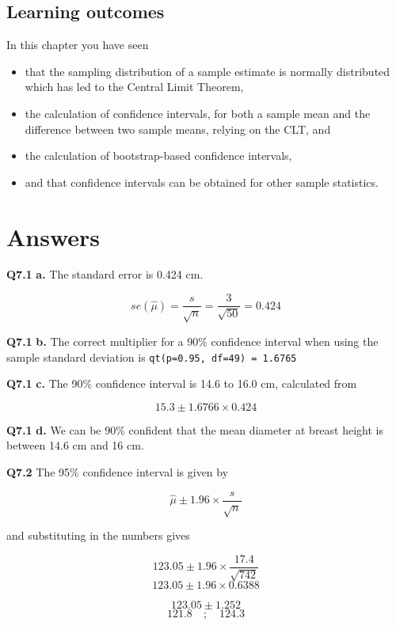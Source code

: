 \documentclass[
  oneside]{krantz}
\providecommand{\tightlist}{%
  \setlength{\itemsep}{0pt}\setlength{\parskip}{0pt}}
\begin{document}
\hypertarget{learning-outcomes-4}{%
\subsection{Learning outcomes}\label{learning-outcomes-4}}

In this chapter you have seen

\begin{itemize}
\tightlist
\item
  that the sampling distribution of a sample estimate is normally distributed which has led to the Central Limit Theorem,
\item
  the calculation of confidence intervals, for both a sample mean and the difference between two sample means, relying on the CLT, and
\item
  the calculation of bootstrap-based confidence intervals,
\item
  and that confidence intervals can be obtained for other sample statistics.
\end{itemize}

\hypertarget{ANSci}{%
\section{Answers}\label{ANSci}}

\textbf{Q7.1} \textbf{a.} The standard error is 0.424 cm.

\[se(\hat \mu) = \frac{s}{\sqrt{n}} = \frac{3}{\sqrt{50}} = 0.424\]

\textbf{Q7.1} \textbf{b.} The correct multiplier for a 90\% confidence interval when using the sample standard deviation is \texttt{qt(p=0.95,\ df=49)\ =\ 1.6765}

\textbf{Q7.1} \textbf{c.} The 90\% confidence interval is 14.6 to 16.0 cm, calculated from

\[15.3 \pm 1.6766 \times 0.424\]

\textbf{Q7.1} \textbf{d.} We can be 90\% confident that the mean diameter at breast height is between 14.6 cm and 16 cm.

\textbf{Q7.2} The 95\% confidence interval is given by

\[\hat \mu \pm 1.96 \times \frac{s}{\sqrt{n}}\]

and substituting in the numbers gives

\[123.05 \pm 1.96 \times \frac{17.4}{\sqrt{742}}\]
\[123.05 \pm 1.96 \times 0.6388\]

\[123.05 \pm 1.252 \]
\[121.8 \quad ; \quad 124.3\]
\end{document}
